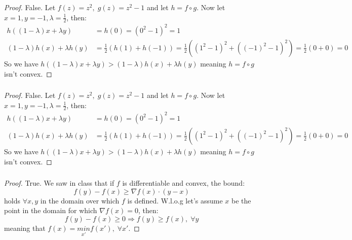 \subsubsection{}
\begin{proof}    
    False. Let $f(z) = z^2, \; g(z) = z^2-1$ and let $h = f \circ g$. Now let $x=1, y=-1, \lambda=\frac{1}{2}$, then:
    \begin{equation*}
        \begin{split}
            h((1-\lambda)x + \lambda y) &= h(0) = (0^2-1)^2 = 1 \\
            (1-\lambda)h(x) + \lambda h(y) &= \frac{1}{2}(h(1) + h(-1)) = \frac{1}{2}((1^2-1)^2 + ((-1)^2-1)^2) = \frac{1}{2} (0 + 0) = 0
        \end{split}
    \end{equation*}
    So we have $h((1-\lambda)x + \lambda y) > (1-\lambda)h(x) + \lambda h(y)$ meaning $h = f \circ g$ isn't convex.
\end{proof}

\subsubsection{}
\begin{proof}
    False. Let $f(z) = z^2, \; g(z) = z^2-1$ and let $h = f \circ g$. Now let $x=1, y=-1, \lambda=\frac{1}{2}$, then:
    \begin{equation*}
        \begin{split}
            h((1-\lambda)x + \lambda y) &= h(0) = (0^2-1)^2 = 1 \\
            (1-\lambda)h(x) + \lambda h(y) &= \frac{1}{2}(h(1) + h(-1)) = \frac{1}{2}((1^2-1)^2 + ((-1)^2-1)^2) = \frac{1}{2} (0 + 0) = 0
        \end{split}
    \end{equation*}
    So we have $h((1-\lambda)x + \lambda y) > (1-\lambda)h(x) + \lambda h(y)$ meaning $h = f \circ g$ isn't convex.
\end{proof}

\subsubsection{}
\begin{proof}
    True. We saw in class that if $f$ is differentiable and convex, the bound:
    \begin{equation*}
        f(y) - f(x) \geq \nabla f(x) \cdot (y-x)
    \end{equation*}
    holds $\forall x,y$ in the domain over which $f$ is defined. W.l.o.g let's assume $x$ be the point in the domain for which $\nabla f(x) = 0$, then:
    \begin{equation*}
        f(y) - f(x) \geq 0 \Rightarrow f(y) \geq f(x), \; \forall y
    \end{equation*}
    meaning that $f(x) = \underset{x'}{min} f(x'), \; \forall x'$.
\end{proof}

